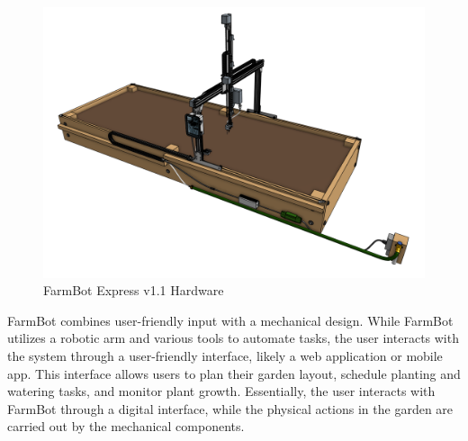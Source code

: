 \begin{figure}
    \centering
    \includegraphics[scale=0.2]{Figures/farmbot_express_v1.1.png}
    \caption{FarmBot Express v1.1 Hardware}
    \label{fig:hardware}
\end{figure}

FarmBot combines user-friendly input with a mechanical design. While FarmBot utilizes a robotic arm and various tools to automate tasks, the user interacts with the system through a user-friendly interface, likely a web application or mobile app. This interface allows users to plan their garden layout, schedule planting and watering tasks, and monitor plant growth.  Essentially, the user interacts with FarmBot through a digital interface, while the physical actions in the garden are carried out by the mechanical components.

